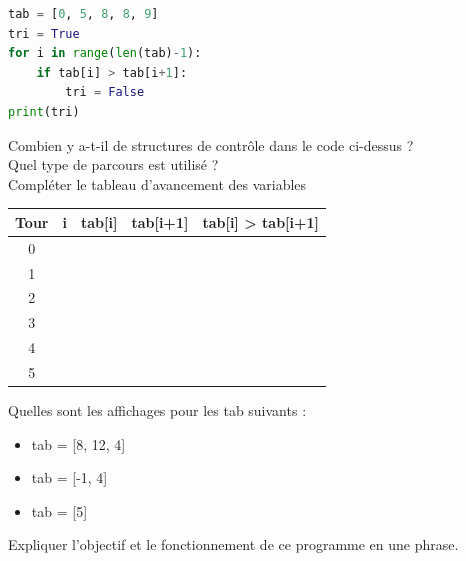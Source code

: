 \begin{Exercise}[title={Vérification tri}]

\begin{lstlisting}[style=pythonstyle, language=Python]
tab = [0, 5, 8, 8, 9]
tri = True
for i in range(len(tab)-1):
    if tab[i] > tab[i+1]:
        tri = False
print(tri)
\end{lstlisting}

\Question Combien y a-t-il de structures de contrôle dans le code ci-dessus ?\\

\Question Quel type de parcours est utilisé ?\\
\Question Compléter le tableau d'avancement des variables

\begin{center}
\large
\begin{tabular}{c|c|c|c|c|}
\textbf{Tour} & \textbf{i} & \textbf{tab[i]} & \textbf{tab[i+1]} & \textbf{tab[i] > tab[i+1]}  \\
\hline
0 &  &  &  & \\
1 &  &  &  & \\
2 &  &  &  & \\
3 &  &  &  & \\
4 &  &  &  & \\
5 &  &  &  & \\
\end{tabular}
\end{center}

\Question Quelles sont les affichages pour les tab suivants : \\
\begin{itemize}
    \item tab = [8, 12, 4]
    \item tab = [-1, 4]
    \item tab = [5]
\end{itemize}

\Question Expliquer l'objectif et le fonctionnement de ce programme en une phrase.\\
\end{Exercise}


